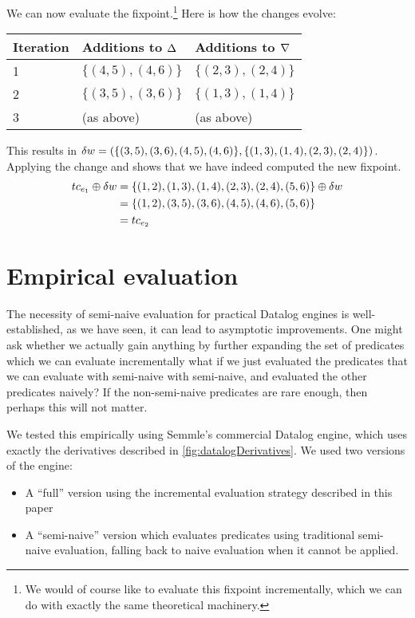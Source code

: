 We can now evaluate the fixpoint.\footnote{We would of course like to evaluate this fixpoint
  incrementally, which we can do with exactly the same theoretical machinery.}
Here is how the changes evolve:
\begin{center}
  \begin{tabular} {p{3.5em} p{10em} p{10em}}
    Iteration & Additions to $\Delta$ & Additions to $\nabla$ \\
    \toprule
    1 & $\{ (4,5), (4,6) \}$ & $\{ (2,3), (2,4) \}$\\
    2 & $\{ (3,5), (3,6) \}$ & $\{ (1,3), (1,4) \}$\\
    3 & (as above) & (as above) \\
    \bottomrule
  \end{tabular}
\end{center}
\medskip

This results in $\delta w = (\{ (3,5), (3,6), (4,5), (4,6)\}, \{(1,3), (1,4), (2,3), (2,4)\})$.
Applying the change and shows that we have indeed computed the new fixpoint.
\begin{align*}
  tc_{e_1} \oplus \delta w &= \{(1,2), (1,3), (1,4), (2,3), (2,4), (5,6)\} \oplus \delta w\\
  &= \{(1,2), (3,5), (3,6), (4,5), (4,6), (5,6)\}\\
  &= tc_{e_2}
\end{align*}

\section{Empirical evaluation}
\label{sec:empirical}

The necessity of semi-naive evaluation for practical Datalog engines is
well-established, as we have seen, it can lead to asymptotic improvements.
One might ask whether we actually gain anything by further expanding the set of predicates
which we can evaluate incrementally \textemdash{} what if we just evaluated the
predicates that we can evaluate with semi-naive with semi-naive, and evaluated
the other predicates naively? If the non-semi-naive predicates are rare enough, then perhaps this
will not matter.

We tested this empirically using Semmle's commercial Datalog engine, which uses
exactly the derivatives described in \cref{fig:datalogDerivatives}. We used two
versions of the engine:
\begin{itemize}
  \item A ``full'' version using the incremental evaluation strategy described in this paper
  \item A ``semi-naive'' version which evaluates predicates using traditional
    semi-naive evaluation, falling back to naive evaluation when it cannot be applied.
\end{itemize}

